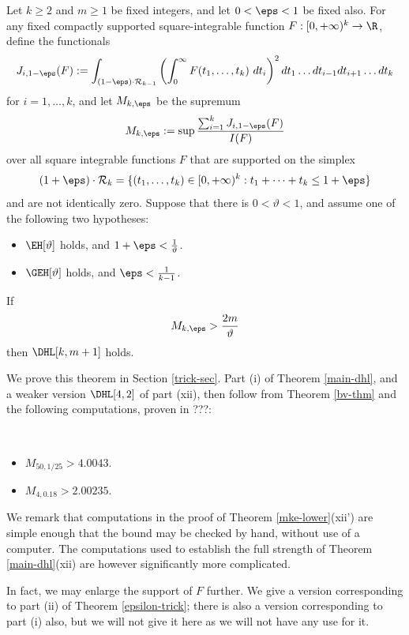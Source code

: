 \begin{theorem}\label{epsilon-trick}  Let $k \geq 2$ and $m \geq 1$ be fixed integers, and let $0 < \eps < 1$ be fixed also. For any fixed compactly supported square-integrable function $F: [0,+\infty)^k \to \R$, define the functionals
$$ J_{i,1-\eps}(F) := \int_{(1-\eps) \cdot {\mathcal R}_{k-1}} \left(\int_0^\infty F(t_1,\dots,t_k)\ dt_i\right)^2 dt_1 \dots dt_{i-1} dt_{i+1} \dots dt_k$$
for $i=1,\dots,k$, and let $M_{k,\eps}$ be the supremum
$$ M_{k,\eps} := \sup \frac{\sum_{i=1}^k J_{i,1-\eps}(F)}{I(F)}$$
over all square integrable functions $F$ that are supported on the simplex
$$ (1+\eps) \cdot {\mathcal R}_k = \{ (t_1,\dots,t_k) \in [0,+\infty)^k: t_1+\dots+t_k \leq 1+\eps \}$$
and are not identically zero.  Suppose that there is $0 < \vartheta < 1$, and assume one of the following two hypotheses:
\begin{itemize}
\item[(i)]  $\EH[\vartheta]$ holds, and $1+\eps < \frac{1}{\vartheta}$.
\item[(ii)] $\GEH[\vartheta]$ holds, and $\eps < \frac{1}{k-1}$.
\end{itemize}
If
$$ M_{k,\eps} > \frac{2m}{\vartheta}$$
then $\DHL[k,m+1]$ holds.
\end{theorem}

We prove this theorem in Section \ref{trick-sec}.  Part (i) of Theorem \ref{main-dhl}, and a weaker version $\DHL[4,2]$ of part (xii), then follow from Theorem \ref{bv-thm} and the following computations, proven in ???:

\begin{theorem}\label{mke-lower}\ 
\begin{itemize}
\item[(i)] $M_{50,1/25} > 4.0043$.
\item[(xii')] $M_{4,0.18} > 2.00235$.
\end{itemize}
\end{theorem}

We remark that computations in the proof of Theorem \ref{mke-lower}(xii') are simple enough that the bound may be checked by hand, without use of a computer.  The computations used to establish the full strength of Theorem \ref{main-dhl}(xii) are however significantly more complicated.

In fact, we may enlarge the support of $F$ further.  We give a version corresponding to part (ii) of Theorem \ref{epsilon-trick}; there is also a version corresponding to part (i) also, but we will not give it here as we will not have any use for it.

